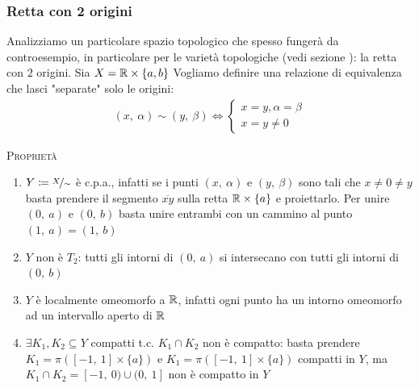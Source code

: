 \subsubsection{Retta con 2 origini} \label{retta 2 origini}
Analizziamo un particolare spazio topologico che spesso fungerà da controesempio, in particolare per le varietà topologiche (vedi sezione   ): la retta con $2$ origini. \newline
Sia $X=\mathbb{R}\times\{a,b\}$ 
Vogliamo definire una relazione di equivalenza che lasci "separate" solo le origini:
	\begin{gather*}
		(x, \ \alpha)\sim (y, \ \beta) \iff 
			\begin{cases}
				x=y, \alpha=\beta \\
				x=y\neq 0
			\end{cases}		
	\end{gather*}

\textsc{Proprietà}
\begin{enumerate}
	\item $Y\coloneqq \nicefrac{X}{\sim}$ è c.p.a., infatti se i punti $(x, \ \alpha)$ e $(y, \ \beta)$ sono tali che $x\neq 0 \neq y$ basta prendere il segmento $\overline{xy}$ sulla retta $\mathbb{R}\times\{a\}$ e proiettarlo. Per unire $(0,\ a)$ e $(0, \ b)$ basta unire entrambi con un cammino al punto $(1, \ a)=(1, \ b)$
	\item $Y$ non è $T_2$: tutti gli intorni di $(0, \ a)$ si intersecano con tutti gli 	intorni di $(0, \ b)$ 
	\item $Y$ è localmente omeomorfo a $\mathbb{R}$, infatti ogni punto ha un intorno omeomorfo ad un intervallo aperto di $\mathbb{R}$
	\item $\exists K_1, K_2\subseteq Y$ compatti t.c. $K_1\cap K_2$ non è compatto: basta prendere $K_1=\pi\left([-1, \ 1]\times \{a\} \right)$ e $K_1=\pi\left([-1, \ 1]\times \{a\} \right)$ compatti in $Y$, ma $K_1\cap K_2= [-1,\ 0) \cup (0,\ 1]$ non è compatto in $Y$
\end{enumerate}

